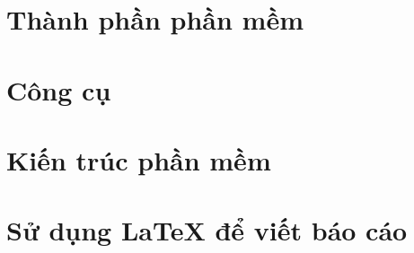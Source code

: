 \section{Thành phần phần mềm}



\section{Công cụ}



\section{Kiến trúc phần mềm}


\section{Sử dụng LaTeX để viết báo cáo}
